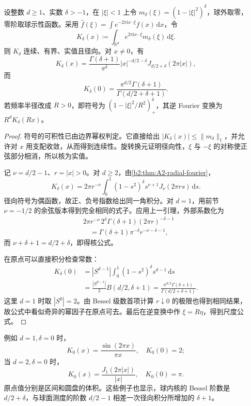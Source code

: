\begin{theorem}
\label{b2:thm:A2-bochner-riesz}
设整数 \(d\geq1\)、实数 \(\delta>-1\)，在 \(|\xi|<1\) 上令
\(m_\delta(\xi)=(1-|\xi|^2)^\delta\)，球外取零，零阶取球示性函数。采用
\(\widehat f(\xi)=\int e^{-2\pi\mathrm i x\cdot\xi}f(x)\,\mathrm dx\)，令
\[
 K_\delta(x)\coloneqq
       \int_{\mathbb R^d}e^{2\pi\mathrm i x\cdot\xi}
                        m_\delta(\xi)\,\mathrm d\xi.
\]
则 \(K_\delta\) 连续、有界、实值且径向。对 \(x\ne0\)，有
\[
 K_\delta(x)=\frac{\Gamma(\delta+1)}{\pi^\delta}
       |x|^{-d/2-\delta}J_{d/2+\delta}(2\pi|x|),
\]
而
\[
 K_\delta(0)=
 \frac{\pi^{d/2}\Gamma(\delta+1)}
      {\Gamma(d/2+\delta+1)}.
\]
若频率半径改成 \(R>0\)，即符号为
\((1-|\xi|^2/R^2)_+^\delta\)，其逆 Fourier 变换为 \(R^dK_\delta(Rx)\)。
\end{theorem}
\begin{proof}
符号的可积性已由边界幂权判定。它直接给出
\(|K_\delta(x)|\leq\|m_\delta\|_1\)，并允许对 \(x\) 用支配收敛，从而得到连续性。旋转换元证明径向性，\(\xi\) 与 \(-\xi\) 的对称使正弦部分相消，所以核为实值。

记 \(\nu=d/2-1\)、\(r=|x|>0\)。对 \(d\geq2\)，由\cref{b2:thm:A2-radial-fourier}，
\[
 K_\delta(x)
 =2\pi r^{-\nu}\int_0^1
       (1-s^2)^\delta s^{\nu+1}J_\nu(2\pi rs)\,\mathrm ds.
\]
径向符号为偶函数，故正、负号指数给出同一角积分。对 \(d=1\)，用前节
\(\nu=-1/2\) 的余弦版本得到完全相同的式子。应用上一引理，外部系数化为
\[
 \begin{aligned}
 &2\pi r^{-\nu}\,
   2^\delta\Gamma(\delta+1)(2\pi r)^{-\delta-1}\\
 &\hspace{1em}=\Gamma(\delta+1)\pi^{-\delta}
                   r^{-\nu-\delta-1},
 \end{aligned}
\]
而 \(\nu+\delta+1=d/2+\delta\)，即得核公式。

在原点可以直接积分检查常数：
\[
 \begin{aligned}
 K_\delta(0)
 &=|S^{d-1}|\int_0^1
          (1-s^2)^\delta s^{d-1}\,\mathrm ds\\
 &=\frac{|S^{d-1}|}{2}B(d/2,\delta+1)
 =\frac{\pi^{d/2}\Gamma(\delta+1)}
        {\Gamma(d/2+\delta+1)}.
 \end{aligned}
\]
这里 \(d=1\) 时取 \(|S^0|=2\)。由 Bessel 级数首项计算 \(r\downarrow0\) 的极限也得到相同结果，故公式中看似奇异的幂因子在原点可去。最后在逆变换中作 \(\xi=R\eta\)，得到尺度公式。
\end{proof}

例如 \(d=1,\delta=0\) 时，
\[
 K_0(x)=\frac{\sin(2\pi x)}{\pi x},\quad K_0(0)=2;
\]
当 \(d=2,\delta=0\) 时，
\[
 K_0(x)=\frac{J_1(2\pi|x|)}{|x|},\quad K_0(0)=\pi.
\]
原点值分别是区间和圆盘的体积。这些例子也显示，球内核的 Bessel 阶数是
\(d/2+\delta\)，与球面测度的阶数 \(d/2-1\) 相差一次径向积分所增加的 \(\delta+1\)。

